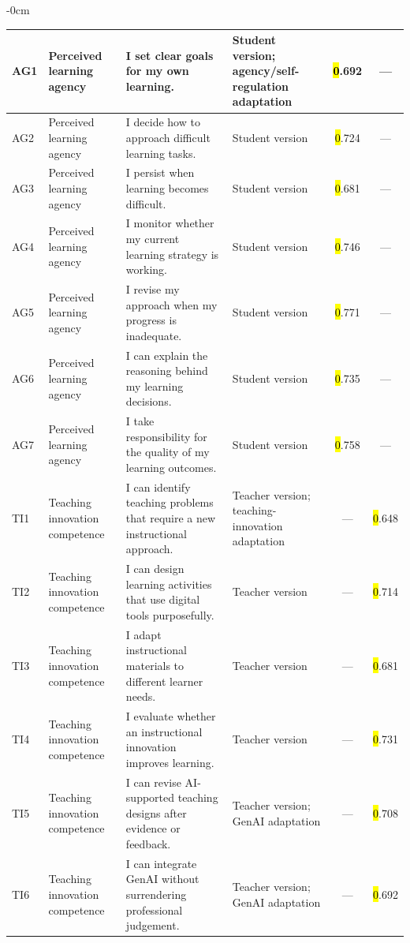 \documentclass[sustainability,article,accept,moreauthors]{Definitions/mdpi}
\begin{document}
\begin{table}[H]
\begin{adjustwidth}{-\extralength}{0cm}
\begin{tabular}{p{1.2cm}p{4cm}p{5cm}p{4cm}cc}
AG1 & Perceived learning agency & I set clear goals for my own learning. & Student version; agency/self-regulation adaptation~\cite{bandura2001,xia2026} &\hl{0}.692 & --- \\\midrule
AG2 & Perceived learning agency & I decide how to approach difficult learning tasks. & Student version &\hl{0}.724 & --- \\\midrule







AG3 & Perceived learning agency & I persist when learning becomes difficult. & Student version &\hl{0}.681 & --- \\\midrule
AG4 & Perceived learning agency & I monitor whether my current learning strategy is working. & Student version &\hl{0}.746 & --- \\\midrule
AG5 & Perceived learning agency & I revise my approach when my progress is inadequate. & Student version &\hl{0}.771 & --- \\\midrule
AG6 & Perceived learning agency & I can explain the reasoning behind my learning decisions. & Student version &\hl{0}.735 & --- \\\midrule
AG7 & Perceived learning agency & I take responsibility for the quality of my learning outcomes. & Student version &\hl{0}.758 & --- \\\midrule
TI1 & Teaching innovation competence & I can identify teaching problems that require a new instructional approach. & Teacher version; teaching-innovation adaptation~\cite{zhaiTeacher2025,mishra2023} & --- &\hl{0}.648 \\\midrule
TI2 & Teaching innovation competence & I can design learning activities that use digital tools purposefully. & Teacher version & --- &\hl{0}.714 \\\midrule
TI3 & Teaching innovation competence & I adapt instructional materials to different learner needs. & Teacher version & --- &\hl{0}.681 \\\midrule
TI4 & Teaching innovation competence & I evaluate whether an instructional innovation improves learning. & Teacher version & --- &\hl{0}.731 \\\midrule







TI5 & Teaching innovation competence & I can revise AI-supported teaching designs after evidence or feedback. & Teacher version; GenAI adaptation & --- &\hl{0}.708 \\\midrule
TI6 & Teaching innovation competence & I can integrate GenAI without surrendering professional judgement. & Teacher version; GenAI adaptation & --- &\hl{0}.692 \\\midrule




\end{tabular}
\end{adjustwidth}
\end{table}
\end{document}
